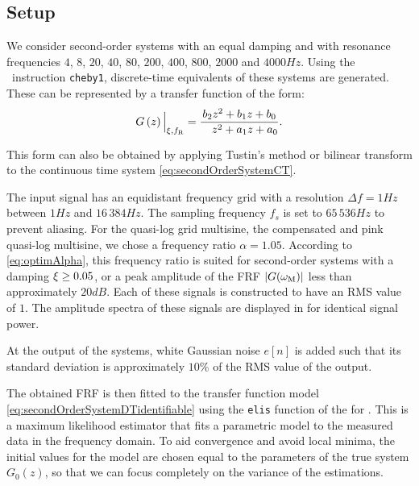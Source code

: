   \subsection{Setup}
  We consider second-order systems with an equal damping and with resonance frequencies $4$, $8$, $20$, $40$, $80$, $200$, $400$, $800$, $2000$ and $4000 \unit{Hz}$.
  Using the \matlab\ instruction \texttt{cheby1}, discrete-time equivalents of these systems are generated.
  These can be represented by a transfer function of the form:
  \begin{equation}
    G \left( z \right)\Big|_{\damping, \fR} =
       \frac{         b_2  z^{2} + b_1 z + b_0}%
            {\phantom{a_2} z^{2} + a_1 z + a_0}
  \text{.}
  \label{eq:secondOrderSystemDTidentifiable}
  \end{equation}

  This form can also be obtained by applying Tustin's method or bilinear transform \citep{Oppenheim1983} to the continuous time system \eqref{eq:secondOrderSystemCT}.

  The input signal has an equidistant frequency grid with a resolution $\Delta f = 1\unit{Hz}$ between $1 \unit{Hz}$ and $16\,384\unit{Hz}$.
  The sampling frequency $f_s$ is set to $65\,536\unit{Hz}$ to prevent aliasing.
  For the quasi-log grid multisine, the compensated and pink quasi-log multisine, we chose a frequency ratio $\alpha = 1.05$.
  According to \eqref{eq:optimAlpha}, this frequency ratio is suited for second-order systems with a damping $\xi \geq 0.05$, or a peak amplitude of the FRF $\left| G(\omega_{\mathrm{M}}) \right|$ less than approximately $20\unit{dB}$.
  Each of these signals is constructed to have an RMS value of $1$.
  The amplitude spectra of these signals are displayed in  for identical signal power.

  At the output of the systems, white Gaussian noise $e[n]$ is added such that its standard deviation is approximately $10\%$ of the RMS value of the output.

  
  The obtained FRF is then fitted to the transfer function model \eqref{eq:secondOrderSystemDTidentifiable} using the \texttt{elis} function of the \FDIDENT \citep{FDIDENT} for \matlab.
  This is a maximum likelihood estimator that fits a parametric model to the measured data in the frequency domain.
  To aid convergence and avoid local minima, the initial values for the model are chosen equal to the parameters of the true system $G_0(z)$, so that we can focus completely on the variance of the estimations.

